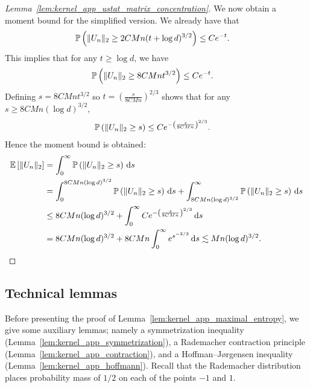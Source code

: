 \begin{proof}[Lemma~\ref{lem:kernel_app_ustat_matrix_concentration}]
  We now obtain a moment bound for the simplified version.
  We already have that
  \begin{align*}
    \P\left(
      \|U_n\|_2
      \geq
      2 C M n
      (t + \log d)^{3/2}
    \right)
    &\leq
    C e^{-t}.
  \end{align*}
  This implies that for any $t \geq \log d$,
  we have
  \begin{align*}
    \P\left(
      \|U_n\|_2
      \geq
      8 C M n
      t^{3/2}
    \right)
    &\leq
    C e^{-t}.
  \end{align*}
  Defining
  $s = 8 C M n t^{3/2}$
  so $t = \left( \frac{s}{8C M n} \right)^{2/3}$
  shows that for any $s \geq 8C M n(\log d)^{3/2}$,
  \begin{align*}
    \P\left(
      \|U_n\|_2
      \geq
      s
    \right)
    &\leq
    C e^{-\left( \frac{s}{8C M n} \right)^{2/3}}.
  \end{align*}
  Hence the moment bound is obtained:
  \begin{align*}
    \E\left[
      \|U_n\|_2
    \right]
    &=
    \int_0^\infty
    \P\left(
      \|U_n\|_2
      \geq
      s
    \right)
    \diff{s} \\
    &=
    \int_0^{8C M n(\log d)^{3/2}}
    \P\left(
      \|U_n\|_2
      \geq
      s
    \right)
    \diff{s}
    +
    \int_{8C M n(\log d)^{3/2}}^\infty
    \P\left(
      \|U_n\|_2
      \geq
      s
    \right)
    \diff{s} \\
    &\leq
    8C M n(\log d)^{3/2}
    +
    \int_0^\infty
    C e^{-\left( \frac{s}{8C M n} \right)^{2/3}}
    \diff{s} \\
    &=
    8C M n(\log d)^{3/2}
    +
    8C M n
    \int_0^\infty
    e^{s^{-2/3}}
    \diff{s}
    \lesssim
    Mn(\log d)^{3/2}.
  \end{align*}
\end{proof}

\subsection{Technical lemmas}

Before presenting the proof of
Lemma~\ref{lem:kernel_app_maximal_entropy},
we give some auxiliary lemmas;
namely a symmetrization inequality
(Lemma~\ref{lem:kernel_app_symmetrization}),
a Rademacher contraction principle
(Lemma~\ref{lem:kernel_app_contraction}),
and a Hoffman--J{\o}rgensen inequality
(Lemma~\ref{lem:kernel_app_hoffmann}).
Recall that the Rademacher distribution
places probability mass of $1/2$
on each of the points $-1$ and $1$.

